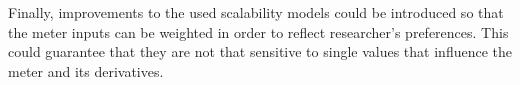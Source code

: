\documentclass{uvamscse}
\begin{document}
Finally, improvements to the used scalability models could be introduced so that the meter inputs can be weighted in order to reflect researcher's preferences. This could guarantee that they are not that sensitive to single values that influence the meter and its derivatives.

{%


}
\end{document}
